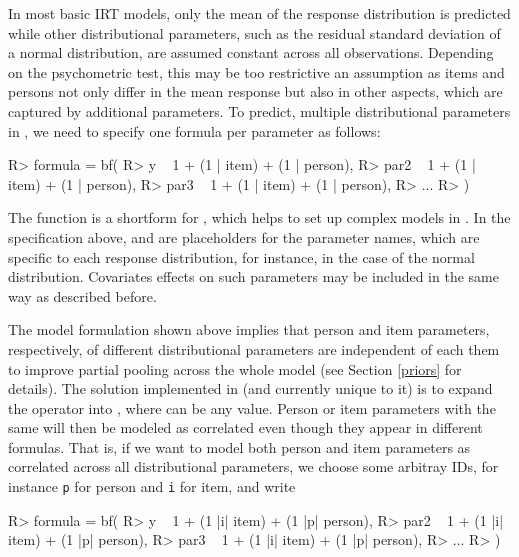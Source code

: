 \documentclass[jss]{jss}
\begin{document}
In most basic IRT models, only the mean of the response distribution is
predicted while other distributional parameters, such as the residual
standard deviation of a normal distribution, are assumed constant across
all observations. Depending on the psychometric test, this may be too
restrictive an assumption as items and persons not only differ in the
mean response but also in other aspects, which are captured by
additional parameters. To predict, multiple distributional parameters in
, we need to specify one formula per parameter as follows:

\begin{CodeChunk}

\begin{CodeInput}
R> formula = bf(
R>   y ~ 1 + (1 | item) + (1 | person),
R>   par2 ~ 1 + (1 | item) + (1 | person),
R>   par3 ~ 1 + (1 | item) + (1 | person),
R>   ...
R> )
\end{CodeInput}
\end{CodeChunk}

The function  is a shortform for , which
helps to set up complex models in . In the specification
above,  and  are placeholders for the parameter
names, which are specific to each response distribution, for instance,
 in the case of the normal distribution. Covariates effects
on such parameters may be included in the same way as described before.

The model formulation shown above implies that person and item
parameters, respectively, of different distributional parameters are
independent of each them to improve partial pooling across the whole
model (see Section \ref{priors} for details). The solution implemented
in  (and currently unique to it) is to expand the \code{|}
operator into , where  can be any value. Person
or item parameters with the same  will then be modeled as
correlated even though they appear in different  formulas.
That is, if we want to model both person and item parameters as
correlated across all distributional parameters, we choose some arbitray
IDs, for instance \texttt{p} for person and \texttt{i} for item, and
write

\begin{CodeChunk}

\begin{CodeInput}
R> formula = bf(
R>   y ~ 1 + (1 |i| item) + (1 |p| person),
R>   par2 ~ 1 + (1 |i| item) + (1 |p| person),
R>   par3 ~ 1 + (1 |i| item) + (1 |p| person),
R>   ...
R> )
\end{CodeInput}
\end{CodeChunk}
\end{document}
